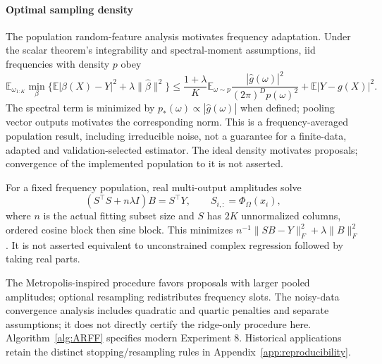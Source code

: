 \documentclass{article}
\newcommand{\E}{\mathbb{E}}
\def\E{\mathbb{E}}
\begin{document}
\paragraph{Optimal sampling density}
The population random-feature analysis motivates frequency adaptation. Under the scalar theorem's integrability and spectral-moment assumptions, iid frequencies with density $p$ obey \citep[Theorem 2.1]{kammonen2020adaptiverandomfourierfeatures}
\[
\E_{\omega_{1:K}}\min_\beta\{\E|\beta(X)-Y|^2+\lambda\|\hat\beta\|^2\}
\le \frac{1+\lambda}{K}\E_{\omega\sim p}\frac{|\widehat g(\omega)|^2}{(2\pi)^D p(\omega)^2}
+\E|Y-g(X)|^2.
\]
The spectral term is minimized by $p_*(\omega)\propto|\widehat g(\omega)|$ when defined; pooling vector outputs motivates the corresponding norm. This is a frequency-averaged population result, including irreducible noise, not a guarantee for a finite-data, adapted and validation-selected estimator. The ideal density motivates proposals; convergence of the implemented population to it is not asserted.

For a fixed frequency population, real multi-output amplitudes solve
\begin{equation}\label{eq:normal_equations_ARFF}
 (S^\top S+n\lambda I)B=S^\top Y,\qquad S_{i,:}=\Phi_\Omega(x_i),
\end{equation}
where $n$ is the actual fitting subset size and $S$ has $2K$ unnormalized columns, ordered cosine block then sine block. This minimizes $n^{-1}\|SB-Y\|_F^2+\lambda\|B\|_F^2$. It is not asserted equivalent to unconstrained complex regression followed by taking real parts.

The Metropolis-inspired procedure \citep{kammonen2020adaptiverandomfourierfeatures} favors proposals with larger pooled amplitudes; optional resampling \citep{Kammonen2025Adaptive} redistributes frequency slots. The noisy-data convergence analysis \citep{huang2025convergenceadaptiveresamplingrandom} includes quadratic and quartic penalties and separate assumptions; it does not directly certify the ridge-only procedure here. Algorithm~\ref{alg:ARFF} specifies modern Experiment 8. Historical applications retain the distinct stopping/resampling rules in Appendix~\ref{app:reproducibility}.
\end{document}
